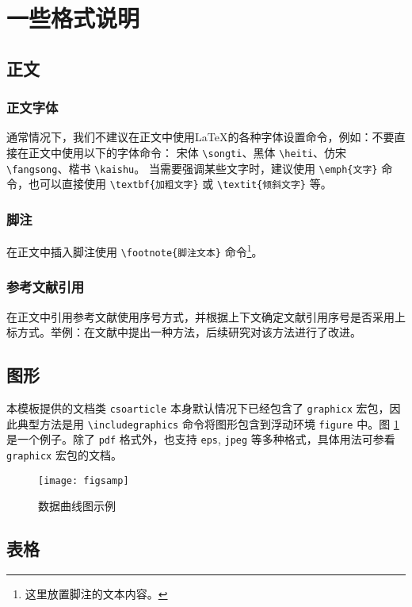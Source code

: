 \documentclass[UTF8]{csoarticle}
\begin{document}
\section{一些格式说明}

\subsection{正文}

\subsubsection{正文字体}

通常情况下，我们不建议在正文中使用\LaTeX{}的各种字体设置命令，例如：不要直接在正文中使用以下的字体命令：
宋体 \verb|\songti|、黑体 \verb|\heiti|、仿宋 \verb|\fangsong|、楷书 \verb|\kaishu|。
当需要强调某些文字时，建议使用 \verb|\emph{文字}| 命令，也可以直接使用 \verb|\textbf{加粗文字}| 或 \verb|\textit{倾斜文字}| 等。

\subsubsection{脚注}

在正文中插入脚注使用 \verb|\footnote{脚注文本}| 命令\footnote{这里放置脚注的文本内容。}。

\subsubsection{参考文献引用}

在正文中引用参考文献使用序号方式，并根据上下文确定文献引用序号是否采用上标方式。举例：在文献\cite{bib1}中提出一种方法，后续研究对该方法进行了改进。

\subsection{图形}

本模板提供的文档类 \verb|csoarticle| 本身默认情况下已经包含了 \verb|graphicx| 宏包，因此典型方法是用 \verb|\includegraphics| 命令将图形包含到浮动环境 \verb|figure| 中。图 \ref{fig:sample} 是一个例子。除了 \verb|pdf| 格式外，也支持 \verb|eps|, \verb|jpeg| 等多种格式，具体用法可参看 \verb|graphicx| 宏包的文档。
\begin{figure}
\centering\texttt{[image: figsamp]}
\caption{数据曲线图示例}
\label{fig:sample}
\end{figure}

\subsection{表格}
\end{document}
